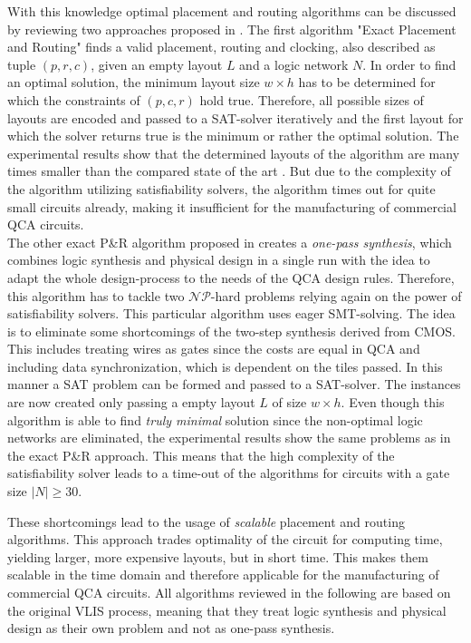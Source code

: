 With this knowledge optimal placement and routing algorithms can be discussed by reviewing two approaches proposed in \cite{Walter}. The first algorithm "Exact Placement and Routing" finds a valid placement, routing and clocking, also described as tuple $(p, r, c)$, given an empty layout $L$ and a logic network $N$. In order to find an optimal solution, the minimum layout size $w \times h$ has to be determined for which the constraints of $(p, c, r)$ hold true. Therefore, all possible sizes of layouts are encoded and passed to a SAT-solver iteratively and the first layout for which the solver returns true is the minimum or rather the optimal solution. The experimental results show that the determined layouts of the algorithm are many times smaller than the compared state of the art \cite{fontes, trindade2016placement}. But due to the complexity of the algorithm utilizing satisfiability solvers, the algorithm times out for quite small circuits already, making it insufficient for the manufacturing of commercial QCA circuits.\\
The other exact P\&R algorithm proposed in \cite{Walter} creates a \textit{one-pass synthesis}, which combines logic synthesis and physical design in a single run with the idea to adapt the whole design-process to the needs of the QCA design rules. Therefore, this algorithm has to tackle two $\mathcal{NP}$-hard problems relying again on the power of satisfiability solvers. This particular algorithm uses eager SMT-solving. The idea is to eliminate some shortcomings of the two-step synthesis derived from CMOS. This includes treating wires as gates since the costs are equal in QCA and including data synchronization, which is dependent on the tiles passed. In this manner a SAT problem can be formed and passed to a SAT-solver. The instances are now created only passing a empty layout $L$ of size $w \times h$. Even though this algorithm is able to find \textit{truly minimal} solution since the non-optimal logic networks are eliminated, the experimental results show the same problems as in the exact P\&R approach. This means that the high complexity of the satisfiability solver leads to a time-out of the algorithms for circuits with a gate size $|N| \geq 30$.

These shortcomings lead to the usage of \textit{scalable} placement and routing algorithms. This approach trades optimality of the circuit for computing time, yielding larger, more expensive layouts, but in short time. This makes them scalable in the time domain and therefore applicable for the manufacturing of commercial QCA circuits. All algorithms reviewed in the following are based on the original VLIS process, meaning that they treat logic synthesis and physical design as their own problem and not as one-pass synthesis.

